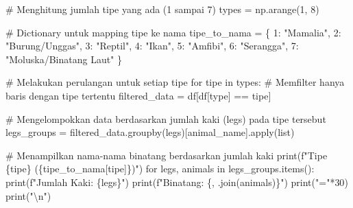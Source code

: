 \documentclass[
  letterpaper,
]{krantz}
\makeatletter
\newenvironment{Shaded}{\begin{snugshade}}{\end{snugshade}}
\newcommand{\BuiltInTok}[1]{\textcolor[rgb]{0.00,0.23,0.31}{#1}}
\newcommand{\CharTok}[1]{\textcolor[rgb]{0.13,0.47,0.30}{#1}}
\newcommand{\CommentTok}[1]{\textcolor[rgb]{0.37,0.37,0.37}{#1}}
\newcommand{\ControlFlowTok}[1]{\textcolor[rgb]{0.00,0.23,0.31}{#1}}
\newcommand{\DecValTok}[1]{\textcolor[rgb]{0.68,0.00,0.00}{#1}}
\newcommand{\KeywordTok}[1]{\textcolor[rgb]{0.00,0.23,0.31}{#1}}
\newcommand{\NormalTok}[1]{\textcolor[rgb]{0.00,0.23,0.31}{#1}}
\newcommand{\OperatorTok}[1]{\textcolor[rgb]{0.37,0.37,0.37}{#1}}
\newcommand{\SpecialCharTok}[1]{\textcolor[rgb]{0.37,0.37,0.37}{#1}}
\newcommand{\SpecialStringTok}[1]{\textcolor[rgb]{0.13,0.47,0.30}{#1}}
\newcommand{\StringTok}[1]{\textcolor[rgb]{0.13,0.47,0.30}{#1}}
\newenvironment{kframe}{%
\medskip{}
\setlength{\fboxsep}{.8em}
 \def\at@end@of@kframe{}%
 \ifinner\ifhmode%
  \def\at@end@of@kframe{\end{minipage}}%
  \begin{minipage}{\columnwidth}%
 \fi\fi%
 \def\FrameCommand##1{\hskip\@totalleftmargin \hskip-\fboxsep
 \colorbox{shadecolor}{##1}\hskip-\fboxsep
     \hskip-\linewidth \hskip-\@totalleftmargin \hskip\columnwidth}%
 \MakeFramed {\advance\hsize-\width
   \@totalleftmargin\z@ \linewidth\hsize
   \@setminipage}}%
 {\par\unskip\endMakeFramed%
 \at@end@of@kframe}
\renewenvironment{Shaded}{\begin{kframe}}{\end{kframe}}
\makeatother
\begin{document}
\begin{Shaded}
\begin{Highlighting}[]
\CommentTok{\# Menghitung jumlah tipe yang ada (1 sampai 7)}
\NormalTok{types }\OperatorTok{=}\NormalTok{ np.arange(}\DecValTok{1}\NormalTok{, }\DecValTok{8}\NormalTok{)}

\CommentTok{\# Dictionary untuk mapping tipe ke nama}
\NormalTok{tipe\_to\_nama }\OperatorTok{=}\NormalTok{ \{}
    \DecValTok{1}\NormalTok{: }\StringTok{"Mamalia"}\NormalTok{,}
    \DecValTok{2}\NormalTok{: }\StringTok{"Burung/Unggas"}\NormalTok{,}
    \DecValTok{3}\NormalTok{: }\StringTok{"Reptil"}\NormalTok{,}
    \DecValTok{4}\NormalTok{: }\StringTok{"Ikan"}\NormalTok{,}
    \DecValTok{5}\NormalTok{: }\StringTok{"Amfibi"}\NormalTok{,}
    \DecValTok{6}\NormalTok{: }\StringTok{"Serangga"}\NormalTok{,}
    \DecValTok{7}\NormalTok{: }\StringTok{"Moluska/Binatang Laut"}
\NormalTok{\}}

\CommentTok{\# Melakukan perulangan untuk setiap tipe}
\ControlFlowTok{for}\NormalTok{ tipe }\KeywordTok{in}\NormalTok{ types:}
    \CommentTok{\# Memfilter hanya baris dengan tipe tertentu}
\NormalTok{    filtered\_data }\OperatorTok{=}\NormalTok{ df[df[}\StringTok{\textquotesingle{}type\textquotesingle{}}\NormalTok{] }\OperatorTok{==}\NormalTok{ tipe]}

    \CommentTok{\# Mengelompokkan data berdasarkan jumlah kaki (legs) pada tipe tersebut}
\NormalTok{    legs\_groups }\OperatorTok{=}\NormalTok{ filtered\_data.groupby(}\StringTok{\textquotesingle{}legs\textquotesingle{}}\NormalTok{)[}\StringTok{\textquotesingle{}animal\_name\textquotesingle{}}\NormalTok{].}\BuiltInTok{apply}\NormalTok{(}\BuiltInTok{list}\NormalTok{)}

    \CommentTok{\# Menampilkan nama{-}nama binatang berdasarkan jumlah kaki}
    \BuiltInTok{print}\NormalTok{(}\SpecialStringTok{f"Tipe }\SpecialCharTok{\{}\NormalTok{tipe}\SpecialCharTok{\}}\SpecialStringTok{ (}\SpecialCharTok{\{}\NormalTok{tipe\_to\_nama[tipe]}\SpecialCharTok{\}}\SpecialStringTok{)"}\NormalTok{)}
    \ControlFlowTok{for}\NormalTok{ legs, animals }\KeywordTok{in}\NormalTok{ legs\_groups.items():}
        \BuiltInTok{print}\NormalTok{(}\SpecialStringTok{f"Jumlah Kaki: }\SpecialCharTok{\{}\NormalTok{legs}\SpecialCharTok{\}}\SpecialStringTok{"}\NormalTok{)}
        \BuiltInTok{print}\NormalTok{(}\SpecialStringTok{f"Binatang: }\SpecialCharTok{\{}\StringTok{\textquotesingle{}, \textquotesingle{}}\SpecialCharTok{.}\NormalTok{join(animals)}\SpecialCharTok{\}}\SpecialStringTok{"}\NormalTok{)}
        \BuiltInTok{print}\NormalTok{(}\StringTok{"="}\OperatorTok{*}\DecValTok{30}\NormalTok{)}
    \BuiltInTok{print}\NormalTok{(}\StringTok{"}\CharTok{\textbackslash{}n}\StringTok{"}\NormalTok{)}
\end{Highlighting}
\end{Shaded}
\end{document}
